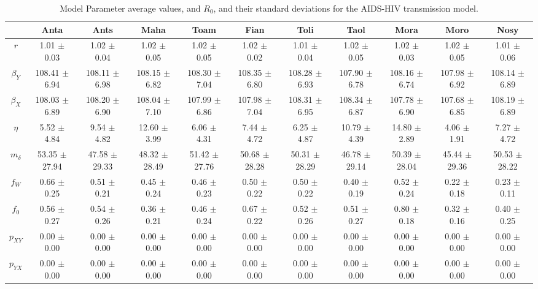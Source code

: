 \begin{sidewaystable}
\caption{Model Parameter average values, and $R_0$, and their standard deviations for the AIDS-HIV transmission model.}
\smallskip{}
\centering
\begin{tabular}{ccccccccccc}
 & {\bf Anta} & {\bf Ants} & {\bf Maha} & {\bf Toam} & {\bf Fian} & {\bf Toli} & {\bf Taol} & {\bf Mora} & {\bf Moro} & {\bf Nosy} \\
\hline\hline
{\bf $r$} & 1.01 $\pm$ 0.03 & 1.02 $\pm$ 0.04 & 1.02 $\pm$ 0.05 & 1.02 $\pm$ 0.05 & 1.02 $\pm$ 0.02 & 1.01 $\pm$ 0.04 & 1.02 $\pm$ 0.05 & 1.02 $\pm$ 0.03 & 1.02 $\pm$ 0.05 & 1.01 $\pm$ 0.06 \\
{\bf $\beta_Y$} & 108.41 $\pm$ 6.94 & 108.11 $\pm$ 6.98 & 108.15 $\pm$ 6.82 & 108.30 $\pm$ 7.04 & 108.35 $\pm$ 6.80 & 108.28 $\pm$ 6.93 & 107.90 $\pm$ 6.78 & 108.16 $\pm$ 6.74 & 107.98 $\pm$ 6.92 & 108.14 $\pm$ 6.89 \\
{\bf $\beta_X$} & 108.03 $\pm$ 6.89 & 108.20 $\pm$ 6.90 & 108.04 $\pm$ 7.10 & 107.99 $\pm$ 6.86 & 107.98 $\pm$ 7.04 & 108.31 $\pm$ 6.95 & 108.34 $\pm$ 6.87 & 107.78 $\pm$ 6.90 & 107.68 $\pm$ 6.85 & 108.19 $\pm$ 6.89 \\
{\bf $\eta$} & 5.52 $\pm$ 4.84 & 9.54 $\pm$ 4.82 & 12.60 $\pm$ 3.99 & 6.06 $\pm$ 4.31 & 7.44 $\pm$ 4.72 & 6.25 $\pm$ 4.87 & 10.79 $\pm$ 4.39 & 14.80 $\pm$ 2.89 & 4.06 $\pm$ 1.91 & 7.27 $\pm$ 4.72 \\
{\bf $m_{\delta}$} & 53.35 $\pm$ 27.94 & 47.58 $\pm$ 29.33 & 48.32 $\pm$ 28.49 & 51.42 $\pm$ 27.76 & 50.68 $\pm$ 28.28 & 50.31 $\pm$ 28.29 & 46.78 $\pm$ 29.14 & 50.39 $\pm$ 28.04 & 45.44 $\pm$ 29.36 & 50.53 $\pm$ 28.22 \\
{\bf $f_W$} & 0.66 $\pm$ 0.25 & 0.51 $\pm$ 0.21 & 0.45 $\pm$ 0.24 & 0.46 $\pm$ 0.23 & 0.50 $\pm$ 0.22 & 0.50 $\pm$ 0.22 & 0.40 $\pm$ 0.19 & 0.52 $\pm$ 0.24 & 0.22 $\pm$ 0.18 & 0.23 $\pm$ 0.11 \\
{\bf $f_0$} & 0.56 $\pm$ 0.27 & 0.54 $\pm$ 0.26 & 0.36 $\pm$ 0.21 & 0.46 $\pm$ 0.24 & 0.67 $\pm$ 0.22 & 0.52 $\pm$ 0.26 & 0.51 $\pm$ 0.27 & 0.80 $\pm$ 0.18 & 0.32 $\pm$ 0.16 & 0.40 $\pm$ 0.25 \\
{\bf $p_{XY}$} & 0.00 $\pm$ 0.00 & 0.00 $\pm$ 0.00 & 0.00 $\pm$ 0.00 & 0.00 $\pm$ 0.00 & 0.00 $\pm$ 0.00 & 0.00 $\pm$ 0.00 & 0.00 $\pm$ 0.00 & 0.00 $\pm$ 0.00 & 0.00 $\pm$ 0.00 & 0.00 $\pm$ 0.00 \\
{\bf $p_{YX}$} & 0.00 $\pm$ 0.00 & 0.00 $\pm$ 0.00 & 0.00 $\pm$ 0.00 & 0.00 $\pm$ 0.00 & 0.00 $\pm$ 0.00 & 0.00 $\pm$ 0.00 & 0.00 $\pm$ 0.00 & 0.00 $\pm$ 0.00 & 0.00 $\pm$ 0.00 & 0.00 $\pm$ 0.00 \\

\end{tabular}
\end{sidewaystable}
